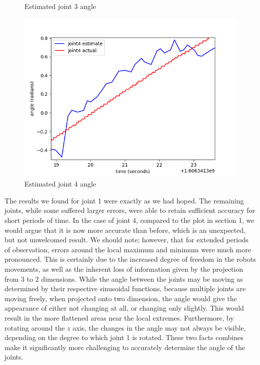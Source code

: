 \documentclass[11pt]{article}
\begin{document}
\begin{figure}[!htb]
    \caption{Estimated joint 3 angle}
\endminipage\hfill
{}
    \includegraphics[width=\linewidth]{../figures/04_joint4.png}
    \caption{Estimated joint 4 angle}
\endminipage\hfill
\end{figure}

The results we found for joint 1 were exactly as we had hoped. 
The remaining joints, while some suffered larger errors, were able to retain sufficient accuracy for short periods of time. 
In the case of joint 4, compared to the plot in section 1, we would argue that it is now more accurate than before, which is an unexpected, but not unwelcomed result. 
We should note; however, that for extended periods of observation, errors around the local maximum and minimum were much more pronounced.
This is certainly due to the increased degree of freedom in the robots movements, as well as the inherent loss of information given by the projection from 3 to 2 dimensions. 
While the angle between the joints may be moving as determined by their respective sinusoidal functions, because multiple joints are moving freely, when projected onto two dimension, the angle would give the appearance of either not changing at all, or changing only slightly. 
This would result in the more flattened areas near the local extremes. 
Furthermore, by rotating around the $z$ axis, the changes in the angle may not always be visible, depending on the degree to which joint 1 is rotated. 
These two facts combines make it significantly more challenging to accurately determine the angle of the joints.
\end{document}
